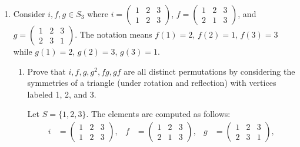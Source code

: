 \begin{enumerate}
\begin{subprove}
\begin{itemize}
    \end{itemize}
    Since all four group properties are satisfied, it follows that \((A(S), \circ)\) is a .
  \end{subprove}
  \begin{define}{Symmetric Group}[def:symmetric-group][red]
    Let \(|S| = n < \infty\). The group \((A(S), \circ)\) is called the 
    \textbf{symmetric group of degree \(n\)}, denoted \(S_{n}\).
    The elements of \(S_{n}\) are called \textbf{permutations}, and \(|S_{n}| = n!\) such that 
    \[
    S_{n} = A(S) = \{\sigma: S \to S \mid \sigma \text{ is a bijection}\}.
    \]
    \textbf{Note}: \(A(S)\) is the set of all bijections from \(S\) to \(S\) for a nonempty set \(S\).
    All finite groups are subgroups of \(S_n\). (Important for .)
  \end{define}
  \item Consider \(i, f, g \in S_{3}\) where \(i = \begin{pmatrix} 1 & 2 & 3 \\ 1 & 2 & 3 \end{pmatrix}\), 
  \(f = \begin{pmatrix} 1 & 2 & 3 \\ 2 & 1 & 3 \end{pmatrix}\), and \(g = \begin{pmatrix} 1 & 2 & 3 \\ 2 & 3 & 1 \end{pmatrix}\). 
  The notation means \(f(1) = 2\), \(f(2) = 1\), \(f(3) = 3\) while \(g(1) = 2\), \(g(2) = 3\), \(g(3) = 1\).
  \begin{enumerate}
    \item Prove that \(i, f, g, g^{2}, f g, g f\) are all distinct permutations by considering the symmetries of a triangle (under rotation and reflection) with vertices labeled 1, 2, and 3.
    \begin{subprove}
      Let \(S = \{1, 2, 3\}\). The elements are computed as follows:
      \begin{align*}
        i &= \begin{pmatrix} 1 & 2 & 3 \\ 1 & 2 & 3 \end{pmatrix}, &
        f &= \begin{pmatrix} 1 & 2 & 3 \\ 2 & 1 & 3 \end{pmatrix}, &
        g &= \begin{pmatrix} 1 & 2 & 3 \\ 2 & 3 & 1 \end{pmatrix}, \\

\end{align*}
\end{subprove}
\end{enumerate}
\end{enumerate}
